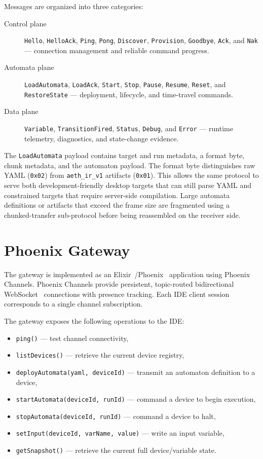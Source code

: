 Messages are organized into three categories:

\begin{description}
  \item[Control plane] \texttt{Hello}, \texttt{HelloAck}, \texttt{Ping}, \texttt{Pong}, \texttt{Discover}, \texttt{Provision}, \texttt{Goodbye}, \texttt{Ack}, and \texttt{Nak} --- connection management and reliable command progress.
  \item[Automata plane] \texttt{LoadAutomata}, \texttt{LoadAck}, \texttt{Start}, \texttt{Stop}, \texttt{Pause}, \texttt{Resume}, \texttt{Reset}, and \texttt{RestoreState} --- deployment, lifecycle, and time-travel commands.
  \item[Data plane] \texttt{Variable}, \texttt{TransitionFired}, \texttt{Status}, \texttt{Debug}, and \texttt{Error} --- runtime telemetry, diagnostics, and state-change evidence.
\end{description}

The \texttt{LoadAutomata} payload contains target and run metadata, a format byte, chunk metadata, and the automaton payload. The format byte distinguishes raw YAML (\texttt{0x02}) from \texttt{aeth\_ir\_v1} artifacts (\texttt{0x01}). This allows the same protocol to serve both development-friendly desktop targets that can still parse YAML and constrained targets that require server-side compilation. Large automata definitions or artifacts that exceed the frame size are fragmented using a chunked-transfer sub-protocol before being reassembled on the receiver side.

\section{Phoenix Gateway}

The gateway is implemented as an Elixir~\cite{Elixir}/Phoenix~\cite{Phoenix} application using Phoenix Channels. Phoenix Channels provide persistent, topic-routed bidirectional WebSocket~\cite{RFC6455} connections with presence tracking. Each IDE client session corresponds to a single channel subscription.

The gateway exposes the following operations to the IDE:
\begin{itemize}
  \item \texttt{ping()} --- test channel connectivity,
  \item \texttt{listDevices()} --- retrieve the current device registry,
  \item \texttt{deployAutomata(yaml, deviceId)} --- transmit an automaton definition to a device,
  \item \texttt{startAutomata(deviceId, runId)} --- command a device to begin execution,
  \item \texttt{stopAutomata(deviceId, runId)} --- command a device to halt,
  \item \texttt{setInput(deviceId, varName, value)} --- write an input variable,
  \item \texttt{getSnapshot()} --- retrieve the current full device/variable state.
\end{itemize}

